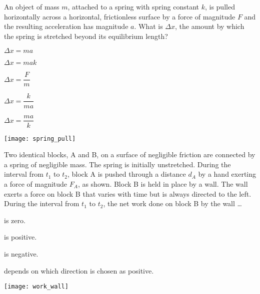 \documentclass[11pt]{article}
\begin{document}
\begin{enumerate}
\item An object of mass $m$, attached to a spring with spring constant $k$, is pulled horizontally across a horizontal, frictionless surface by a force of magnitude $F$ and the resulting acceleration has magnitude $a$. What is $\Delta x$, the amount by which the spring is stretched beyond its equilibrium length?\\
\begin{minipage}[t]{.45\lw}
\begin{choices}
\item $\Delta x=ma$
\item $\Delta x=mak$
\item $\Delta x=\dfrac{F}{m}$
\item $\Delta x=\dfrac{k}{ma}$
\item $\Delta x=\dfrac{ma}{k}$
\end{choices}
\end{minipage}\hfill
\begin{minipage}[t]{.5\lw}
\vspace{0in}
\flushright
\texttt{[image: spring\_pull]}
\end{minipage}

\begin{minipage}[t]{.6\lw}
\item Two identical blocks, A and B, on a surface of negligible friction are connected by a spring of negligible mass. The spring is initially unstretched. During the interval from $t_1$ to $t_2$, block A is pushed through a distance $d_A$ by a hand exerting a force of magnitude $F_A$, as shown. Block B is held in place by a wall. The wall exerts a force on block B that varies with time but is always directed to the left. During the interval from $t_1$ to $t_2$, the net work done on block B by the wall \ldots
\begin{choices}
\item is zero.
\item is positive.
\item is negative.
\item depends on which direction is chosen as positive.
\end{choices}
\end{minipage}\hfill
\begin{minipage}[t]{.35\lw}
\vspace{0in}
\flushright
\texttt{[image: work\_wall]}
\end{minipage}

\vfill


\end{enumerate}
\end{document}
